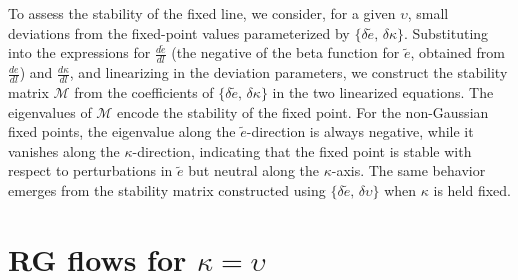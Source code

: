 To assess the stability of the fixed line, we consider, for a given 
$\upsilon$, small deviations from the fixed-point values parameterized 
by $\{\delta\tilde{e},\,\delta\kappa\}$. Substituting into the 
expressions for $\frac{d\tilde{e}}{dl}$ (the negative of the beta 
function for $\tilde{e}$, obtained from $\frac{de}{dl}$) and 
$\frac{d\kappa}{dl}$, and linearizing in the deviation parameters, we 
construct the stability matrix $\mathcal{M}$ from the coefficients of 
$\{\delta\tilde{e},\,\delta\kappa\}$ in the two linearized equations. 
The eigenvalues of $\mathcal{M}$ encode the stability of the fixed 
point. For the non-Gaussian fixed points, the eigenvalue along the 
$\tilde{e}$-direction is always negative, while it vanishes along the 
$\kappa$-direction, indicating that the fixed point is stable with 
respect to perturbations in $\tilde{e}$ but neutral along the 
$\kappa$-axis. The same behavior emerges from the stability matrix 
constructed using $\{\delta\tilde{e},\,\delta\upsilon\}$ when $\kappa$ 
is held fixed.

\section{RG flows for $\kappa = \upsilon $}
\label{secrg2}


